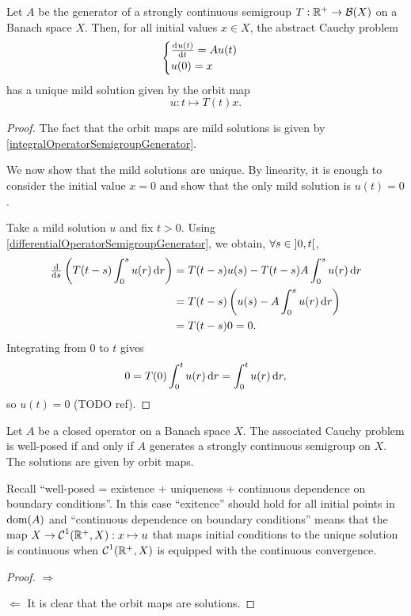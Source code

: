 \begin{proposition}
Let $A$ be the generator of a strongly continuous semigroup $T: \mathbb{R}^+\to \operatorname{\mathcal{B}}(X)$ on a Banach space $X$. Then, for all initial values $x\in X$, the abstract Cauchy problem
\[ \begin{cases}
\od{u(t)}{t} = Au(t) \\ u(0) = x
\end{cases} \]
has a unique mild solution given by the orbit map
\[ u: t\mapsto T(t)x. \]
\end{proposition}
\begin{proof}
The fact that the orbit maps are mild solutions is given by \ref{integralOperatorSemigroupGenerator}.

We now show that the mild solutions are unique. By linearity, it is enough to consider the initial value $x=0$ and show that the only mild solution is $u(t) = 0$.

Take a mild solution $u$ and fix $t >0$. Using \ref{differentialOperatorSemigroupGenerator}, we obtain, $\forall s\in\interval[o]{0,t}$,
\begin{align*}
\od{}{s}\left(T(t-s)\int_0^su(r)\diff{r}\right) &= T(t-s)u(s) - T(t-s)A\int_0^su(r)\diff{r} \\
&= T(t-s)\left(u(s) - A\int_0^su(r)\diff{r}\right) \\
&= T(t-s)0 = 0.
\end{align*}
Integrating from $0$ to $t$ gives
\[ 0 = T(0)\int_0^tu(r)\operatorname{d \!}{r} = \int_0^tu(r)\operatorname{d \!}{r}, \]
so $u(t) = 0$ (TODO ref).
\end{proof}

\begin{proposition}
Let $A$ be a closed operator on a Banach space $X$. The associated Cauchy problem is well-posed \textup{if and only if} $A$ generates a strongly continuous semigroup on $X$. The solutions are given by orbit maps.
\end{proposition}
Recall ``well-posed = existence + uniqueness + continuous dependence on boundary conditions''.
In this case  ``exitence'' should hold for all initial points in $\operatorname{dom}(A)$ and ``continuous dependence on boundary conditions'' means that the map $X\to \operatorname{\mathcal{C}}^1(\mathbb{R}^+, X): x\mapsto u$ that maps initial conditions to the unique solution is continuous when $\operatorname{\mathcal{C}}^1(\mathbb{R}^+, X)$ is equipped with the continuous convergence.
\begin{proof}
$\boxed{\Rightarrow}$


$\boxed{\Leftarrow}$ It is clear that the orbit maps are solutions. 
\end{proof}

